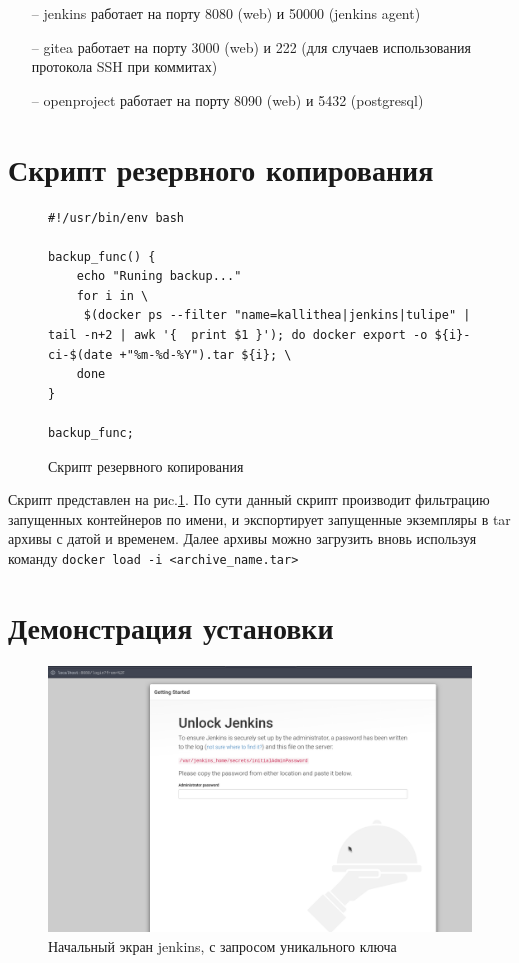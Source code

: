 \documentclass[a4paper]{extarticle}
\begin{document}
\begin{itemize}
\item[--] jenkins работает на порту 8080 (web) и 50000 (jenkins agent)
\item[--] gitea работает на порту 3000 (web) и 222 (для случаев использования протокола SSH при коммитах)
\item[--] openproject работает на порту 8090 (web) и 5432 (postgresql)
\end{itemize}

\section{Скрипт резервного копирования}

\begin{figure}[H]
\begin{verbatim}
#!/usr/bin/env bash

backup_func() {
	echo "Runing backup..."
	for i in \
	 $(docker ps --filter "name=kallithea|jenkins|tulipe" | tail -n+2 | awk '{  print $1 }'); do docker export -o ${i}-ci-$(date +"%m-%d-%Y").tar ${i}; \
	done
}

backup_func;

\end{verbatim}
\caption{Скрипт резервного копирования}
\label{fig:backup}
\end{figure}

Скрипт представлен на риc.\ref{fig:backup}. По сути данный  скрипт производит фильтрацию запущенных контейнеров по имени, и экспортирует запущенные экземпляры в tar архивы с датой и временем. Далее архивы можно загрузить вновь используя команду 
\texttt{docker load -i <archive\_name.tar>}

\section{Демонстрация установки}

\begin{figure}[H]
\includegraphics[width=\textwidth,height=\textheight,keepaspectratio]{jenkins_setup.png}
\caption{Начальный экран jenkins, с запросом уникального ключа}
\end{figure}
\end{document}

